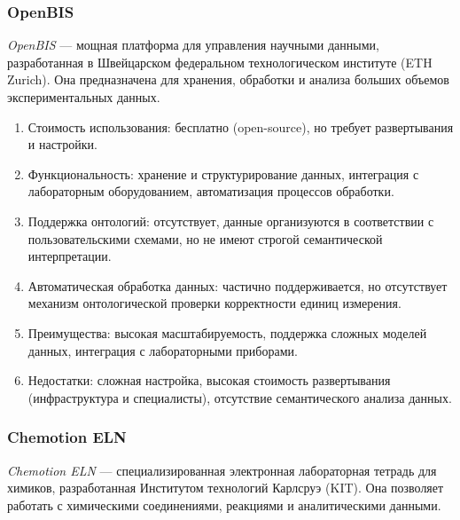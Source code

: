 \subsubsection{OpenBIS}

\textit{OpenBIS}\cite{ELN:OpenBIS} — мощная платформа для управления научными данными, разработанная в Швейцарском федеральном технологическом институте (ETH Zurich). Она предназначена для хранения, обработки и анализа больших объемов экспериментальных данных.


\begin{enumerate}
    \item Стоимость использования: бесплатно (open-source), но требует развертывания и настройки.
    \item Функциональность: хранение и структурирование данных, интеграция с лабораторным оборудованием, автоматизация процессов обработки.
    \item Поддержка онтологий: отсутствует, данные организуются в соответствии с пользовательскими схемами, но не имеют строгой семантической интерпретации.
    \item Автоматическая обработка данных: частично поддерживается, но отсутствует механизм онтологической проверки корректности единиц измерения.
    \item Преимущества: высокая масштабируемость, поддержка сложных моделей данных, интеграция с лабораторными приборами.
    \item Недостатки: сложная настройка, высокая стоимость развертывания (инфраструктура и специалисты), отсутствие семантического анализа данных.
\end{enumerate}

\subsubsection{Chemotion ELN}

\textit{Chemotion ELN}\cite{ELN:Chemotion} — специализированная электронная лабораторная тетрадь для химиков, разработанная Институтом технологий Карлсруэ (KIT). Она позволяет работать с химическими соединениями, реакциями и аналитическими данными.


